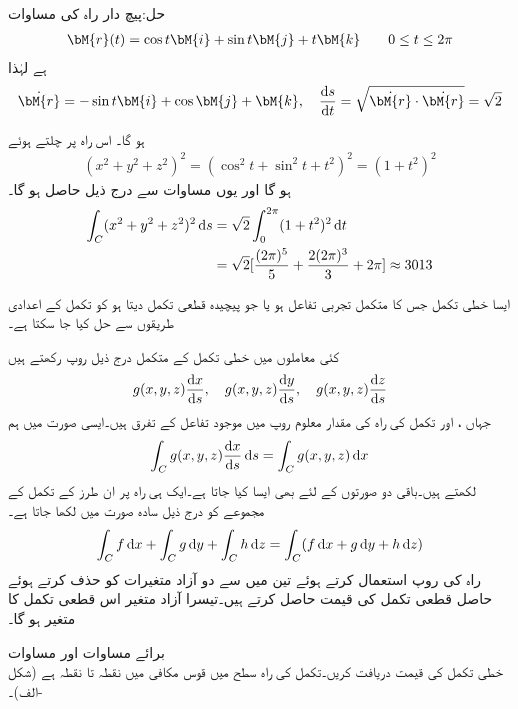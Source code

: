 حل:پیچ دار راہ کی مساوات 
\begin{align*}
\bM{r}(t)=\cos t\bM{i}+\sin t\bM{j}+t\bM{k}\quad \quad 0\le t \le 2\pi
\end{align*}
ہے لہٰذا
\begin{align*}
 \dot{\bM{r}}=-\sin t\bM{i}+\cos \bM{j}+\bM{k},\quad \frac{\dif s}{\dif t}=\sqrt{\dot{\bM{r}}\cdot \dot{\bM{r}}}=\sqrt{2}
\end{align*}

 ہو گا۔  اس راہ پر چلتے ہوئے 
\begin{align*}
(x^2+y^2+z^2)^2=(\cos^2 t+\sin^2 t+t^2)^2=(1+t^2)^2
\end{align*}
ہو گا اور یوں مساوات  سے درج ذیل حاصل ہو گا۔
\begin{align*}
\int_C (x^2+y^2+z^2)^2\dif s&=\sqrt{2}\int_0^{2\pi} (1+t^2)^2\dif t\\
&=\sqrt{2}[\frac{(2\pi)^5}{5}+\frac{2(2\pi)^3}{3}+2\pi]\approx 3013
\end{align*}

ایسا خطی تکمل جس کا متکمل تجربی تفاعل ہو یا جو پیچیدہ قطعی تکمل دیتا ہو کو تکمل کے اعدادی طریقوں سے حل کیا جا سکتا ہے۔   

کئی معاملوں میں خطی تکمل کے متکمل درج ذیل روپ رکھتے ہیں
\begin{align}
g(x,y,z)\frac{\dif x}{\dif s},\quad g(x,y,z)\frac{\dif y}{\dif s},\quad g(x,y,z)\frac{\dif z}{\dif s}
\end{align}
جہاں ،  اور  تکمل کی راہ کی مقدار معلوم روپ میں موجود تفاعل کے تفرق ہیں۔ایسی صورت میں ہم
\begin{align}\label{مساوات_خطی_تکمل_کئی_آزاد_الف}
\int_C g(x,y,z)\frac{\dif x}{\dif s}\dif s=\int_C g(x,y,z)\dif x
\end{align}
لکھتے ہیں۔باقی دو صورتوں کے لئے بھی ایسا کیا جاتا ہے۔ایک ہی راہ  پر ان طرز کے تکمل کے مجموعے کو درج ذیل سادہ صورت میں لکھا جاتا ہے۔
\begin{align}\label{مساوات_خطی_تکمل_کئی_آزاد_ب}
\int_C f\dif x+\int_C g\dif y+\int_C h\dif z=\int_C (f\dif x+g\dif y+h\dif z)
\end{align}
راہ  کی روپ استعمال کرتے ہوئے تین میں سے دو آزاد متغیرات کو حذف کرتے ہوئے حاصل قطعی تکمل کی قیمت حاصل کرتے ہیں۔تیسرا آزاد متغیر اس قطعی تکمل کا متغیر ہو گا۔

\quad برائے مساوات  اور مساوات \\
خطی تکمل   کی قیمت دریافت کریں۔تکمل کی راہ سطح  میں قوس مکافی   میں نقطہ  تا نقطہ  ہے (شکل -الف)۔

